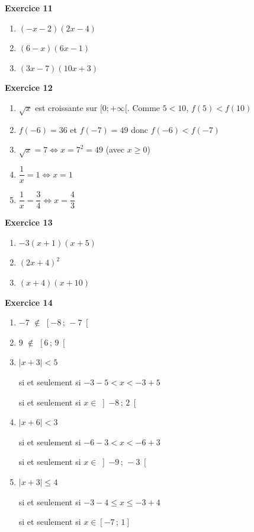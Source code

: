 \documentclass[12pt,a4paper,french]{article}
\begin{document}
\noindent\textbf{Exercice 11}\par
\smallskip
\begin{enumerate}
\item $(-x - 2)(2x - 4)$
\item $(6 - x)(6x - 1)$
\item $(3x - 7)(10x + 3)$
\end{enumerate}
\medskip

\noindent\textbf{Exercice 12}\par
\smallskip
\begin{enumerate}
\item $\sqrt{x}$ est croissante sur $[0;+\infty[$. Comme $5 < 10$, $f(5) < f(10)$
\item $f(-6) = 36$ et $f(-7) = 49$ donc $f(-6) < f(-7)$
\item $\sqrt{x} = 7 \Longleftrightarrow x = 7^2 = 49$ (avec $x \geq 0$)
\item $\dfrac{1}{x} = 1 \Longleftrightarrow x = 1$
\item $\dfrac{1}{x} = \dfrac{3}{4} \Longleftrightarrow x = \dfrac{4}{3}$
\end{enumerate}
\medskip

\noindent\textbf{Exercice 13}\par
\smallskip
\begin{enumerate}
\item $-3(x + 1)(x + 5)$
\item $(2x + 4)^2$
\item $(x + 4)(x + 10)$
\end{enumerate}
\medskip

\noindent\textbf{Exercice 14}\par
\smallskip
\begin{enumerate}
\item $-7$ $\notin$ $\left[ -8 \,;\, -7 \right[$
\item $9$ $\notin$ $\left[ 6 \,;\, 9 \right[$
\item $|x + 3| < 5$

si et seulement si $-3 - 5 < x < -3 + 5$

si et seulement si $x \in \left] -8 \,;\, 2 \right[$
\item $|x + 6| < 3$

si et seulement si $-6 - 3 < x < -6 + 3$

si et seulement si $x \in \left] -9 \,;\, -3 \right[$
\item $|x + 3| \leqslant 4$

si et seulement si $-3 - 4 \leq x \leq -3 + 4$

si et seulement si $x \in \left[ -7 \,;\, 1 \right]$
\end{enumerate}
\medskip
\end{document}
